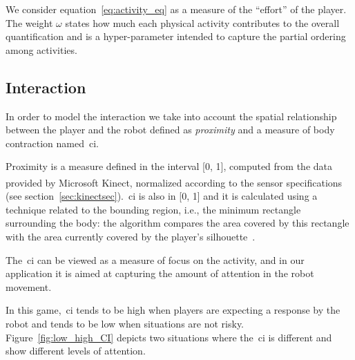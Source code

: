 We consider equation~\ref{eq:activity_eq} as a measure of the ``effort'' of the player. The weight $\omega$ states how much each physical activity contributes to the overall quantification and is a hyper-parameter intended to capture the partial ordering among activities.

\subsection{Interaction}\label{Interaction}
In order to model the interaction we take into account the spatial relationship between the player and the robot defined as \textit{proximity} and a measure of body contraction named~\acrfull{ci}.

Proximity is a measure defined in the interval [0, 1], computed from the data provided by Microsoft Kinect\textsuperscript{\textregistered}, normalized according to the sensor specifications (see section~\ref{sec:kinectsec}).~\gls{ci} is also in [0, 1] and it is calculated using a technique related to the bounding region, i.e., the minimum rectangle surrounding the body: the algorithm compares the area covered by this rectangle with the area currently covered by the player's silhouette~\citep{castellano_recognising_2007}.

The~\glsdesc{ci} can be viewed as a measure of focus on the activity, and in our application it is aimed at capturing the amount of attention in the robot movement. 

In this game,~\gls{ci} tends to be high when players are expecting a response by the robot and tends to be low when situations are not risky. Figure~\ref{fig:low_high_CI} depicts two situations where the~\gls{ci} is different and show different levels of attention.

